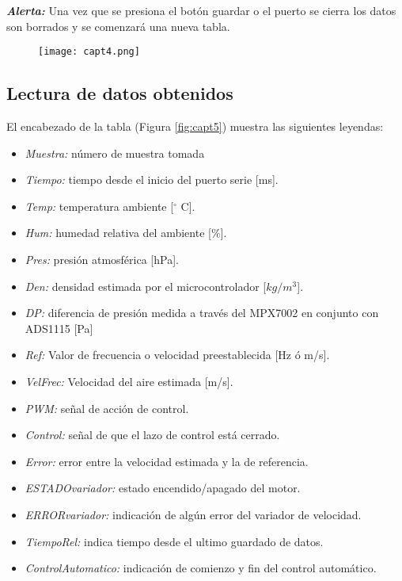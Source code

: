 \textbf{\textit{Alerta:}} Una vez que se presiona el botón guardar o el puerto se cierra los datos son borrados y se comenzará una nueva tabla.

\begin{figure}[H]
	\centering
	\texttt{[image: capt4.png]}
	\label{fig:capt4}
\end{figure}


\subsection{Lectura de datos obtenidos}
El encabezado de la tabla (Figura \ref{fig:capt5}) muestra las siguientes leyendas:

\begin{itemize}
	\item \textit{Muestra:} número de muestra tomada
	\item \textit{Tiempo:} tiempo desde el inicio del puerto serie [ms].
	\item \textit{Temp:} temperatura ambiente [$^{\circ}$ C].
	\item \textit{Hum:} humedad relativa del ambiente [\%].
	\item \textit{Pres:} presión atmosférica [hPa].
	\item \textit{Den:} densidad estimada por el microcontrolador [$kg/m^3$].
	\item \textit{DP:} diferencia de presión medida a través del MPX7002 en conjunto con ADS1115 [Pa]
	\item \textit{Ref:} Valor de frecuencia o velocidad preestablecida [Hz ó m/s].
	\item \textit{VelFrec:} Velocidad del aire estimada [m/s].
	\item \textit{PWM:} señal de acción de control.
	\item \textit{Control:} señal de que el lazo de control está cerrado.
	\item \textit{Error:} error entre la velocidad estimada y la de referencia.
	\item \textit{ESTADOvariador:} estado encendido/apagado del motor.
	\item \textit{ERRORvariador:} indicación de algún error del variador de velocidad.
	\item \textit{TiempoRel:} indica tiempo desde el ultimo guardado de datos.
	\item \textit{ControlAutomatico:} indicación de comienzo y fin del control automático.
		
\end{itemize}

